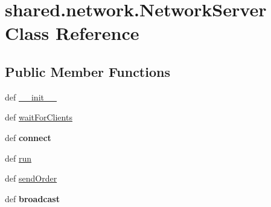 \hypertarget{classshared_1_1network_1_1_network_server}{\section{shared.\-network.\-Network\-Server \-Class \-Reference}
\label{classshared_1_1network_1_1_network_server}
}
\subsection*{\-Public \-Member \-Functions}
\begin{DoxyCompactItemize}
\item 
def \hyperlink{classshared_1_1network_1_1_network_server_a6aeeeeaf8a6ffd779976937de4d8ba1a}{\-\_\-\-\_\-init\-\_\-\-\_\-}
\item 
def \hyperlink{classshared_1_1network_1_1_network_server_ab0fb24417f7ef51323b39cf7c08c21da}{wait\-For\-Clients}
\item 
\hypertarget{classshared_1_1network_1_1_network_server_a418cd00474345643afb54f5dd42948b4}{def {\bfseries connect}}\label{classshared_1_1network_1_1_network_server_a418cd00474345643afb54f5dd42948b4}

\item 
def \hyperlink{classshared_1_1network_1_1_network_server_a17fa54ca058fb9fecdd90e0a5107f651}{run}
\item 
def \hyperlink{classshared_1_1network_1_1_network_server_a61fe06df661e8306b215f3d106d6f78c}{send\-Order}
\item 
\hypertarget{classshared_1_1network_1_1_network_server_ad45cf035ab91146a0d3fd68d019c5815}{def {\bfseries broadcast}}\label{classshared_1_1network_1_1_network_server_ad45cf035ab91146a0d3fd68d019c5815}

\end{DoxyCompactItemize}
